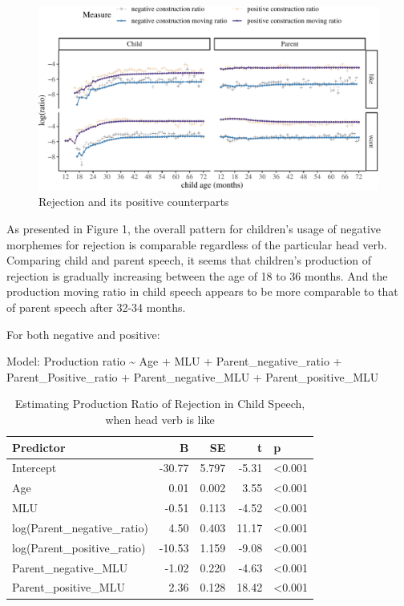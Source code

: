 \documentclass[
  english,
  man,floatsintext]{apa6}
\begin{document}
\begin{figure}[H]

{\centering \includegraphics{neg_construction_article_files/figure-latex/emotion-1} 

}

\caption{Rejection and its positive counterparts}\label{fig:emotion}
\end{figure}

As presented in Figure 1, the overall pattern for children's usage of negative morphemes for rejection is comparable regardless of the particular head verb. Comparing child and parent speech, it seems that children's production of rejection is gradually increasing between the age of 18 to 36 months. And the production moving ratio in child speech appears to be more comparable to that of parent speech after 32-34 months.

For both negative and positive:

Model: Production ratio \textasciitilde{} Age + MLU + Parent\_negative\_ratio + Parent\_Positive\_ratio + Parent\_negative\_MLU + Parent\_positive\_MLU

\begin{table}

\caption{\label{tab:unnamed-chunk-1}Estimating Production Ratio of Rejection in Child Speech, when head verb is like}
\centering
\begin{tabular}[t]{l|r|r|r|l}
\hline
Predictor & B & SE & t & p\\
\hline
Intercept & -30.77 & 5.797 & -5.31 & <0.001\\
\hline
Age & 0.01 & 0.002 & 3.55 & <0.001\\
\hline
MLU & -0.51 & 0.113 & -4.52 & <0.001\\
\hline
log(Parent\_negative\_ratio) & 4.50 & 0.403 & 11.17 & <0.001\\
\hline
log(Parent\_positive\_ratio) & -10.53 & 1.159 & -9.08 & <0.001\\
\hline
Parent\_negative\_MLU & -1.02 & 0.220 & -4.63 & <0.001\\
\hline
Parent\_positive\_MLU & 2.36 & 0.128 & 18.42 & <0.001\\
\hline
\end{tabular}
\end{table}
\end{document}
